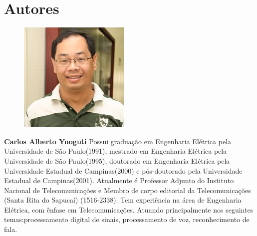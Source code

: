 \section*{Autores}

\begin{figure}
\includegraphics[width=\linewidth]{figuras/autor1.jpg}
\end{figure}

 \textbf{Carlos Alberto Ynoguti} Possui graduação em Engenharia Elétrica pela Universidade de São Paulo(1991), mestrado em Engenharia Elétrica pela Universidade de São Paulo(1995), doutorado em Engenharia Elétrica pela Universidade Estadual de Campinas(2000) e pós-doutorado pela Universidade Estadual de Campinas(2001). Atualmente é Professor Adjunto do Instituto Nacional de Telecomunicações e Membro de corpo editorial da Telecomunicações (Santa Rita do Sapucaí) (1516-2338). Tem experiência na área de Engenharia Elétrica, com ênfase em Telecomunicações. Atuando principalmente nos seguintes temas:processamento digital de sinais, processamento de voz, reconhecimento de fala. 

